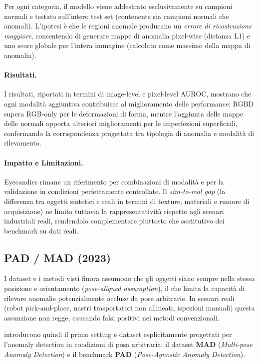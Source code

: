 Per ogni categoria, il modello viene addestrato esclusivamente su cam\-pio\-ni normali e testato sull'intero test set (contenente sia campioni normali che anomali). L'ipotesi è che le regioni anomale producano un \textit{errore di ricostruzione maggiore}, consentendo di generare mappe di anomalia pixel-wise (distanza L1) e uno score globale per l'intera immagine (calcolato come massimo della mappa di anomalia). 

\paragraph{Risultati.} I risultati, riportati in termini di image-level e pixel-level AUROC, mostrano che ogni modalità aggiuntiva contribuisce al miglioramento delle performance: RGBD supera RGB-only per le deformazioni di forma, mentre l'aggiunta delle mappe delle normali apporta ulteriori miglioramenti per le imperfezioni superficiali, confermando la corrispondenza progettata tra tipologia di anomalia e modalità di rilevamento.

\paragraph{Impatto e Limitazioni.} Eyecandies rimane un riferimento per combinazioni di modalità e per la validazione in condizioni perfettamente controllate. Il \textit{sim-to-real gap} (la differenza tra oggetti sintetici e reali in termini di texture, materiali e rumore di acquisizione) ne limita tuttavia la rappresentatività rispetto agli scenari industriali reali, rendendolo complementare piuttosto che sostitutivo dei benchmark su dati reali.

\subsection{PAD / MAD (2023)}
\label{sec:pad}

I dataset e i metodi visti finora assumono che gli oggetti siano sempre nella stessa posizione e orientamento (\textit{pose-aligned assumption}), il che limita la capacità di rilevare anomalie potenzialmente occluse da pose arbitrarie. In scenari reali (robot pick-and-place, nastri trasportatori non allineati, ispezioni manuali) questa assunzione non regge, causando falsi positivi nei metodi convenzionali. 

\citeauthor{zhou2023pad} \cite{zhou2023pad} introducono quindi il primo setting e dataset esplicitamente progettati per l'anomaly detection in condizioni di posa arbitraria: il dataset \textbf{MAD} (\textit{Multi-pose Anomaly Detection}) e il benchmark \textbf{PAD} (\textit{Pose-Agnostic Anomaly Detection}).


